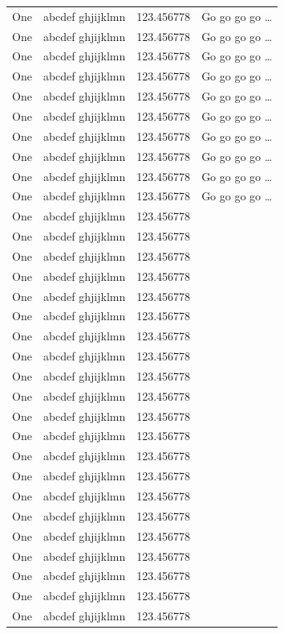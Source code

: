 \documentclass[phd]{ndsu-thesis-2022}
\begin{document}
{\begin{longtable}{l c c c }
One & abcdef ghjijklmn & 123.456778  & Go go go go \ldots \\
One & abcdef ghjijklmn & 123.456778  & Go go go go \ldots \\
One & abcdef ghjijklmn & 123.456778  & Go go go go \ldots \\
One & abcdef ghjijklmn & 123.456778  & Go go go go \ldots \\
One & abcdef ghjijklmn & 123.456778  & Go go go go \ldots \\
One & abcdef ghjijklmn & 123.456778  & Go go go go \ldots \\
One & abcdef ghjijklmn & 123.456778  & Go go go go \ldots \\
One & abcdef ghjijklmn & 123.456778  & Go go go go \ldots \\
One & abcdef ghjijklmn & 123.456778  & Go go go go \ldots \\
One & abcdef ghjijklmn & 123.456778  & Go go go go \ldots \\
One & abcdef ghjijklmn & 123.456778 \\
One & abcdef ghjijklmn & 123.456778 \\
One & abcdef ghjijklmn & 123.456778 \\
One & abcdef ghjijklmn & 123.456778 \\
One & abcdef ghjijklmn & 123.456778 \\
One & abcdef ghjijklmn & 123.456778 \\
One & abcdef ghjijklmn & 123.456778 \\
One & abcdef ghjijklmn & 123.456778 \\
One & abcdef ghjijklmn & 123.456778 \\
One & abcdef ghjijklmn & 123.456778 \\
One & abcdef ghjijklmn & 123.456778 \\
One & abcdef ghjijklmn & 123.456778 \\
One & abcdef ghjijklmn & 123.456778 \\
One & abcdef ghjijklmn & 123.456778 \\
One & abcdef ghjijklmn & 123.456778 \\
One & abcdef ghjijklmn & 123.456778 \\
One & abcdef ghjijklmn & 123.456778 \\
One & abcdef ghjijklmn & 123.456778 \\
One & abcdef ghjijklmn & 123.456778 \\
One & abcdef ghjijklmn & 123.456778 \\
One & abcdef ghjijklmn & 123.456778 \\

\end{longtable}}
\end{document}

